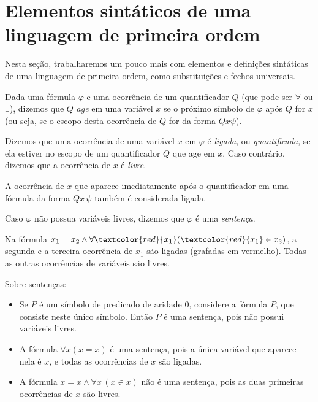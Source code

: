 \section{Elementos sintáticos de uma linguagem de primeira ordem}\label{sec:elementosSintaticosPrimeiraOrdem}

Nesta seção, trabalharemos um pouco mais com elementos e definições sintáticas de uma linguagem de primeira ordem, como substituições e fechos universais.

\begin{metadefinition}\label{mdef:variaveisLigadasELivres}
    Dada uma fórmula $\varphi$ e uma ocorrência de um quantificador $Q$ (que pode ser $\forall$ ou $\exists$), dizemos que $Q$ \emph{age} em uma variável $x$ se o próximo símbolo de $\varphi$ após $Q$ for $x$ (ou seja, se o escopo desta ocorrência de $Q$ for da forma $Q x \psi$).

    Dizemos que uma ocorrência de uma variável $x$ em $\varphi$ é \emph{ligada}, ou \emph{quantificada}, se ela estiver no escopo de um quantificador $Q$ que age em $x$.
    Caso contrário, dizemos que a ocorrência de $x$ é \emph{livre}.

    A ocorrência de $x$ que aparece imediatamente após o quantificador em uma fórmula da forma $Qx\,\psi$ também é considerada ligada.

    Caso $\varphi$ não possua variáveis livres, dizemos que $\varphi$ é uma \emph{sentença}.
\end{metadefinition}

\begin{example}\label{exa:variaveisLigadasELivres}
    Na fórmula $x_1 = x_2 \wedge \forall \textcolor{red}{x_1} (\textcolor{red}{x_1} \in x_3)$, a segunda e a terceira ocorrência de $x_1$ são ligadas (grafadas em vermelho).
    Todas as outras ocorrências de variáveis são livres.
\end{example}

\begin{example}\label{exa:sentencas}Sobre sentenças:
\begin{itemize}
        \item Se $P$ é um símbolo de predicado de aridade $0$, considere a fórmula $P$, que consiste neste único símbolo.
        Então $P$ é uma sentença, pois não possui variáveis livres.
    
        \item A fórmula $\forall x (x = x)$ é uma sentença, pois a única variável que aparece nela é $x$, e todas as ocorrências de $x$ são ligadas.
    
        \item A fórmula $x = x \wedge \forall x \,(x \in x)$ não é uma sentença, pois as duas primeiras ocorrências de $x$ são livres.
\end{itemize}
\end{example}

